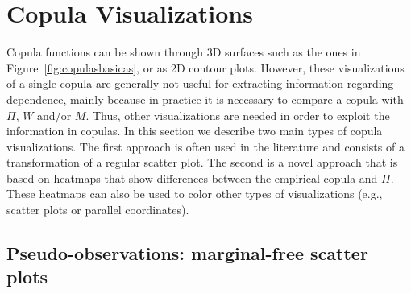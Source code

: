 \documentclass[journal]{vgtc}                %
\begin{document}
\section{Copula Visualizations}
\label{sec:copulavisualizations}

Copula functions can be shown through 3D surfaces such as the ones in Figure~\ref{fig:copulasbasicas}, or as 2D contour plots. However, these visualizations of a single copula are generally not useful for extracting information regarding dependence, mainly because in practice it is necessary to compare a copula with $\Pi$, $W$ and/or $M$. Thus, other visualizations are needed in order to exploit the information in copulas. In this section we describe two main types of copula visualizations. The first approach is often used in the literature and consists of a transformation of a regular scatter plot. The second is a novel approach that is based on heatmaps that show differences between the empirical copula and $\Pi$. These heatmaps can also be used to color other types of visualizations (e.g., scatter plots or parallel coordinates).

\subsection{Pseudo-observations: marginal-free scatter plots}
\label{sec:pseudoobservations}
\end{document}

